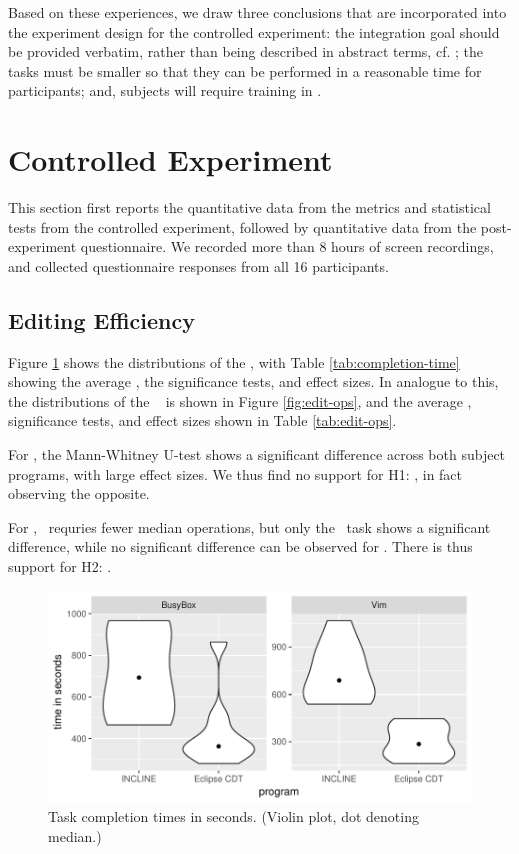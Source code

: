 Based on these experiences, we draw three conclusions that are incorporated into the experiment design for the controlled experiment: the integration goal should be provided verbatim, rather than being described in abstract terms, cf. \cite{berger2016mps}; the tasks must be smaller so that they can be performed in a reasonable time for participants; and, subjects will require training in \tooln.


\section{Controlled Experiment}
This section first reports the quantitative data from the metrics and statistical tests from the controlled experiment, followed by quantitative data from the post-experiment questionnaire. We recorded more than 8 hours of screen recordings, and collected questionnaire responses from all 16 participants.

\subsection{Editing Efficiency}
Figure \ref{fig:completion-times} shows the distributions of the \ctimes, with Table \ref{tab:completion-time} showing the average \ctimes, the significance tests, and effect sizes. In analogue to this, the distributions of the \eops~ is shown in Figure \ref{fig:edit-ops}, and the average \eops, significance tests, and effect sizes shown in Table \ref{tab:edit-ops}.

For \ctimes, the Mann-Whitney U-test shows a significant difference across both subject programs, with large effect sizes. We thus find no support for H1: \textit{\HA}, in fact observing the opposite.

For \eops, \tooln~requries fewer median operations, but only the \busybox~task shows a significant difference, while no significant difference can be observed for \vim. There is thus support for H2: \textit{\HB}.

\begin{figure}[ht]
    \centering
    \includegraphics{figure/incl-violin-all.pdf}
    \caption{Task completion times in seconds. (Violin plot, dot denoting median.)}
    \label{fig:completion-times}
\end{figure}

